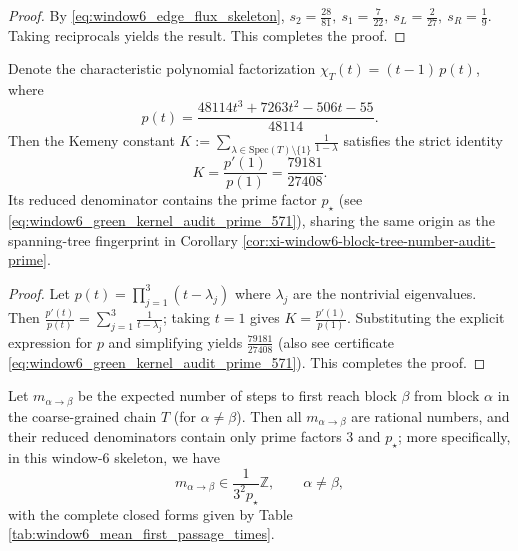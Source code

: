 \begin{proof}
By \eqref{eq:window6_edge_flux_skeleton},
\(
s_2=\frac{28}{81},\ s_1=\frac{7}{22},\ s_L=\frac{2}{27},\ s_R=\frac{1}{9}
\).
Taking reciprocals yields the result. This completes the proof.
\end{proof}

\begin{proposition}\label{prop:xi-window6-kemeny-constant-rational}
Denote the characteristic polynomial factorization \(\chi_T(t)=(t-1)\,p(t)\), where
\[
p(t)=\frac{48114t^{3}+7263t^{2}-506t-55}{48114}.
\]
Then the Kemeny constant
\(
K:=\sum_{\lambda\in\mathrm{Spec}(T)\setminus\{1\}}\frac{1}{1-\lambda}
\)
satisfies the strict identity
\[
K=\frac{p'(1)}{p(1)}=\frac{79181}{27408}.
\]
Its reduced denominator contains the prime factor \(p_\star\) (see \eqref{eq:window6_green_kernel_audit_prime_571}), sharing the same origin as the spanning-tree fingerprint in Corollary \ref{cor:xi-window6-block-tree-number-audit-prime}.
\end{proposition}

\begin{proof}
Let \(p(t)=\prod_{j=1}^{3}(t-\lambda_j)\) where \(\lambda_j\) are the nontrivial eigenvalues.
Then \(\frac{p'(t)}{p(t)}=\sum_{j=1}^{3}\frac{1}{t-\lambda_j}\); taking \(t=1\) gives \(K=\frac{p'(1)}{p(1)}\).
Substituting the explicit expression for \(p\) and simplifying yields \(\frac{79181}{27408}\) (also see certificate \eqref{eq:window6_green_kernel_audit_prime_571}). This completes the proof.
\end{proof}

\begin{corollary}\label{cor:xi-window6-mean-first-passage-denominator-quantization}
Let \(m_{\alpha\to\beta}\) be the expected number of steps to first reach block \(\beta\) from block \(\alpha\) in the coarse-grained chain \(T\) (for \(\alpha\neq\beta\)).
Then all \(m_{\alpha\to\beta}\) are rational numbers, and their reduced denominators contain only prime factors \(3\) and \(p_\star\); more specifically, in this window-\(6\) skeleton, we have
\[
m_{\alpha\to\beta}\in \frac{1}{3^{2}p_\star}\mathbb Z,\qquad \alpha\neq\beta,
\]
with the complete closed forms given by Table \ref{tab:window6_mean_first_passage_times}.
\end{corollary}


